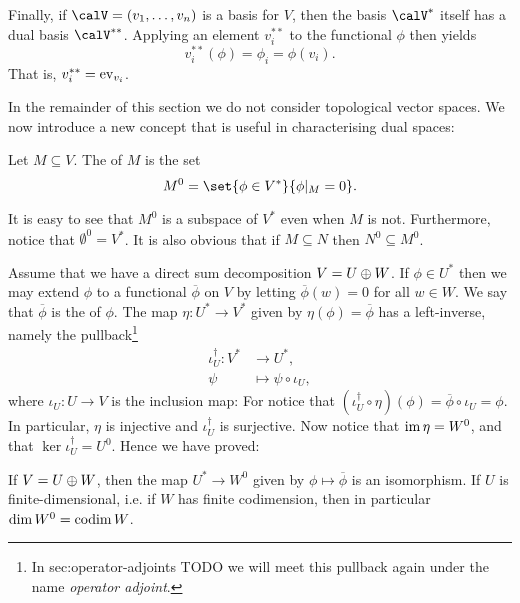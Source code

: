 Finally, if $\calV = (v_1, \ldots, v_n)$ is a basis for $V$, then the basis $\calV^*$ itself has a dual basis $\calV^{**}$. Applying an element $v_i^{**}$ to the functional $\phi$ then yields
%
\begin{equation*}
    v_i^{**}(\phi)
        = \phi_i
        = \phi(v_i).
\end{equation*}
%
That is, $v_i^{**} = \mathrm{ev}_{v_i}$.


In the remainder of this section we do not consider topological vector spaces. We now introduce a new concept that is useful in characterising dual spaces:

\begin{definition}
    Let $M \subseteq V$. The  of $M$ is the set
    \begin{equation*}
        M^0
            = \set{\phi \in V^*}{\phi|_M = 0}.
    \end{equation*}
\end{definition}
%
It is easy to see that $M^0$ is a subspace of $V^*$ even when $M$ is not. Furthermore, notice that $\emptyset^0 = V^*$. It is also obvious that if $M \subseteq N$ then $N^0 \subseteq M^0$.

Assume that we have a direct sum decomposition $V = U \oplus W$. If $\phi \in U^*$ then we may extend $\phi$ to a functional $\overline{\phi}$ on $V$ by letting $\overline{\phi}(w) = 0$ for all $w \in W$. We say that $\overline{\phi}$ is the  of $\phi$. The map $\eta \colon U^* \to V^*$ given by $\eta(\phi) = \overline{\phi}$ has a left-inverse, namely the pullback\footnote{In {sec:operator-adjoints} TODO we will meet this pullback again under the name \emph{operator adjoint}.}
%
\begin{align*}
    \iota_U^\dagger \colon V^* &\to U^*, \\
    \psi &\mapsto \psi \circ \iota_U,
\end{align*}
%
where $\iota_U \colon U \to V$ is the inclusion map: For notice that $(\iota_U^\dagger \circ \eta)(\phi) = \overline{\phi} \circ \iota_U = \phi$. In particular, $\eta$ is injective and $\iota_U^\dagger$ is surjective. Now notice that $\operatorname{im} \eta = W^0$, and that $\ker \iota_U^\dagger = U^0$. Hence we have proved:

\begin{propositionnoproof}
    \label{prop:subspace-dual-complement-annihilator}
    If $V = U \oplus W$, then the map $U^* \to W^0$ given by $\phi \mapsto \overline{\phi}$ is an isomorphism. If $U$ is finite-dimensional, i.e. if $W$ has finite codimension, then in particular $\dim W^0 = \operatorname{codim} W$.
\end{propositionnoproof}

